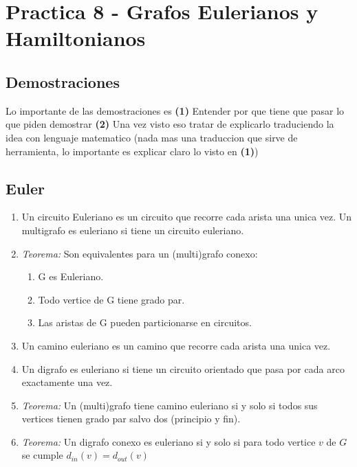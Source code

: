 \section{Practica 8 - Grafos Eulerianos y Hamiltonianos}
\subsection{Demostraciones}
Lo importante de las demostraciones es \textbf{(1)} Entender por que tiene que pasar lo que piden demostrar \textbf{(2)} Una vez visto eso tratar de explicarlo traduciendo la idea con lenguaje matematico (nada mas una traduccion que sirve de herramienta, lo importante es explicar claro lo visto en \textbf{(1)})

\subsection{Euler}
\begin{enumerate}
\item Un circuito Euleriano es un circuito que recorre cada arista una unica vez. Un multigrafo es euleriano si tiene un circuito euleriano.
\item \textit{Teorema:} Son equivalentes para un (multi)grafo conexo:
   \begin{enumerate}
   \item G es Euleriano.
   \item Todo vertice de G tiene grado par.
   \item Las aristas de G pueden particionarse en circuitos.
   \end{enumerate}
\item Un camino euleriano es un camino que recorre cada arista una unica vez.
\item Un digrafo es euleriano si tiene un circuito orientado que pasa por cada arco exactamente una vez.
\item \textit{Teorema:} Un (multi)grafo tiene camino euleriano si y solo si todos sus vertices tienen grado par salvo dos (principio y fin).
\item \textit{Teorema:} Un digrafo conexo es euleriano si y solo si para todo vertice $v$ de $G$ se cumple $d_{in}(v) = d_{out}(v)$
\end{enumerate}

